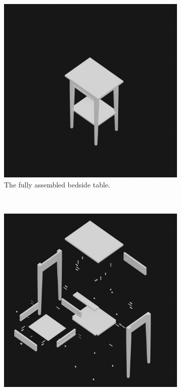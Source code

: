 \documentclass{l4proj}
\begin{document}
\begin{figure}[hbt!]
    \centering
    \begin{subfigure}[b]{0.45\textwidth}
        \includegraphics[width=\textwidth]{dissertation/images/assembledModel.jpg}
        \caption{The fully assembled bedside table.}
        \label{fig:syn1}
    \end{subfigure}
    ~ %
    \begin{subfigure}[b]{0.45\textwidth}
        \includegraphics[width=\textwidth]{dissertation/images/explodedModel.jpg}

\end{subfigure}
\end{figure}
\end{document}
